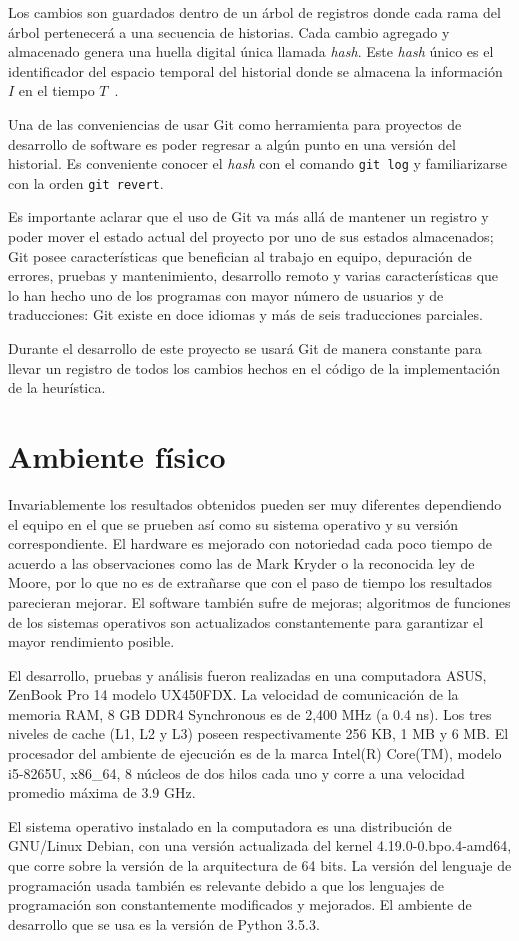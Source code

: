 Los cambios son guardados dentro de un árbol de registros donde cada rama 
del árbol pertenecerá a una secuencia de historias. 
Cada cambio agregado y almacenado genera una huella digital única llamada \textit{hash}. 
Este \emph{hash} único es el identificador del espacio
temporal del historial donde se almacena la información $I$ en el tiempo $T$~\cite{git-about}.

Una de las conveniencias de usar Git como herramienta para proyectos de desarrollo 
de software es poder regresar a algún punto en una versión del historial. Es
conveniente conocer el \emph{hash} con el comando \texttt{git log} y familiarizarse con 
la orden \texttt{git revert}.

Es importante aclarar que el uso de Git va más allá de mantener un registro 
y poder mover el estado actual del proyecto por uno de sus estados 
almacenados; Git posee características que benefician al trabajo en equipo,
depuración de errores, pruebas y mantenimiento, desarrollo remoto y varias
características que lo han hecho uno de los programas con mayor número de usuarios y 
de traducciones: Git existe en doce idiomas y más de seis traducciones parciales.

Durante el desarrollo de este proyecto se usará Git de manera constante
para llevar un registro de todos los cambios hechos en el código de la
implementación de la heurística.

\section{Ambiente físico}
\label{sec:ambiente-fisico}

Invariablemente los resultados obtenidos pueden ser muy diferentes dependiendo 
el equipo en el que se prueben así como su sistema operativo y su versión correspondiente. 
El hardware es mejorado con notoriedad cada poco tiempo de acuerdo a las observaciones 
como las de Mark Kryder o la reconocida ley de Moore, por lo que no es de extrañarse 
que con el paso de tiempo los resultados parecieran mejorar. El software también 
sufre de mejoras; algoritmos de funciones de los sistemas operativos son actualizados 
constantemente para garantizar el mayor rendimiento posible. 

El desarrollo, pruebas y análisis fueron realizadas en una computadora 
ASUS, ZenBook Pro 14 modelo UX450FDX. La velocidad de comunicación de 
la memoria RAM, 8 GB DDR4 Synchronous es de 2,400 MHz (a 0.4 ns). Los 
tres niveles de cache (L1, L2 y L3) poseen respectivamente 256 KB, 1 MB y 6 MB.
El procesador del ambiente de ejecución es de la marca Intel(R) Core(TM), 
modelo i5-8265U, x86\_64, 8 núcleos de dos hilos cada uno y corre a una velocidad 
promedio máxima de 3.9 GHz. 

El sistema operativo instalado en la computadora es una distribución de GNU/Linux 
Debian, con una versión actualizada del kernel 4.19.0-0.bpo.4-amd64, que corre 
sobre la versión de la arquitectura de 64 bits. La versión del lenguaje de programación usada 
también es relevante debido a que los lenguajes de programación son constantemente 
modificados y mejorados. El ambiente de desarrollo que se usa es la versión 
de Python 3.5.3.


